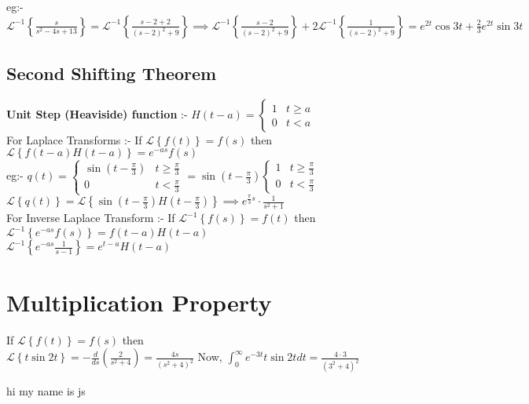 \documentclass{article}
\begin{document}
eg:- $\mathcal{L}^{-1} \left \{\frac{s}{s^2-4s+13} \right \} = \mathcal{L}^{-1} \left \{ \frac{s-2+2}{(s-2)^2+9}  \right \} \implies  \mathcal{L}^{-1} \left \{ \frac{s-2}{(s-2)^2+9} \right \} + 2 \mathcal{L}^{-1} \left \{ \frac{1}{(s-2)^2+9} \right \} = e^{2t} \cos 3t + \frac{2}{3}e^{2t}\sin 3t   $

\subsection{Second Shifting Theorem}%
  \label{sub:Second Shifting Theorem}
  \textbf{Unit Step (Heaviside) function} :- $H(t-a) = \begin{cases}
    1 & t\ge a \\
    0 & t <a
  \end{cases}$ \\
  For Laplace Transforms :- 
If $\mathcal{L} \left \{f(t) \right \} = f(s)$ then $\mathcal{L} \left \{f(t-a)H(t-a) \right \} = e^{-as} f(s)  $ \\

eg:- $q(t) = \begin{cases} 
  \sin(t-\frac{\pi}{3}) & t\ge \frac{\pi}{3} \\
  0 & t<\frac{\pi}{3}
\end{cases}
= \sin(t-\frac{\pi}{3}) \begin{cases}
  1 & t \ge \frac{\pi}{3} \\
  0 & t< \frac{\pi}{3}
\end{cases}$ \\
$\mathcal{L} \left \{q(t) \right \} = \mathcal{L} \left \{\sin(t-\frac{\pi}{3}) H(t-\frac{\pi}{3}) \right \} \implies e^{\frac{\pi}{3}s}\cdot \frac{1}{s^2+1}   $ \\
For Inverse Laplace Transform :- If $\mathcal{L}^{-1} \left \{f(s) \right \} = f(t)$ then $\mathcal{L}^{-1} \left \{e^{-as} f(s)  \right \} = f(t-a)H(t-a) $ \\
$\mathcal{L}^{-1} \left \{e^{-as} \frac{1}{s-1}  \right \} = e^{t-a} H(t-a) $

\section{Multiplication Property}%
  \label{sec:Multiplication Property}
  If $\mathcal{L} \left \{f(t) \right \}   = f(s)$ then  \\
  $ \mathcal{L} \left \{t\sin 2t \right \} = - \frac{d}{ds}(\frac{2}{s^2+4})= \frac{4s}{(s^2 + 4)^2}$ Now, $\int_0^{\infty}  e^{-3t} t\sin 2t dt = \frac{4\cdot 3}{(3^2+4)^2}  $

hi my name is js  
\end{document}
